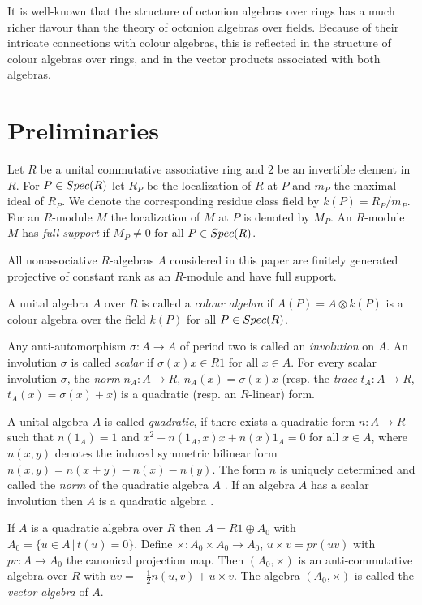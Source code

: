 \documentclass[10pt]{amsart}
\theoremstyle{plain}
\theoremstyle{definition}
\begin{document}
It is well-known that the structure of octonion algebras over rings has a much richer flavour than the theory of octonion algebras over fields.
Because of their intricate connections with colour algebras, this is reflected in the structure of colour algebras over rings, and in the vector products associated with both algebras.


\section{Preliminaries}\label{sec:1}

Let $R$ be a unital commutative associative ring and $2$ be an invertible element in $R$.
  For $P \in {\rm Spec}(R)$ let $R_P$ be the localization of $R$ at $P$  and $m_P$ the maximal ideal of $R_P$. We denote the corresponding residue class field by $k(P)=R_P/m_P$. For an $R$-module $M$ the localization of
$M$ at $P$ is denoted by $M_P$. An $R$-module $M$  has {\it full support}  if $M_P\not=0$ for all $P\in {\rm Spec}(R)$.

 All nonassociative $R$-algebras $A$ considered in this paper are finitely generated projective of constant rank as an $R$-module and have full support.

 A unital algebra $A$ over $R$ is called a \emph{colour algebra} if $A(P)=A\otimes k(P)$ is a colour algebra over the field $k(P)$ for all $P \in {\rm Spec}(R)$.

 Any anti-automorphism $\sigma:A\rightarrow A$ of period two is called an {\it involution} on $A$.
An involution $\sigma$ is called {\it scalar} if  $\sigma(x)x\in R1$ for all $x\in A$.
For every scalar involution $\sigma$,  the {\it norm} $n_A:A\rightarrow R$, $n_A(x)=\sigma(x)x$ (resp. the {\it trace} $t_A:A\rightarrow R$, $t_A(x)=\sigma(x)+x$) is a quadratic (resp. an $R$-linear) form.

 A unital algebra $A$ is called {\it quadratic}, if there exists a quadratic
form $n \colon A \rightarrow R$ such that $n(1_A) = 1$ and $x^2 - n(1_A, x)x + n(x)
1_A = 0$ for all $x \in A$, where $n(x,y)$ denotes the
induced symmetric bilinear form  $n(x, y) = n (x+y) - n(x) -n(y)$. The form $n$ is uniquely determined
and called the {\it norm} of the quadratic algebra $A$ \cite{P2}.  If an algebra $A$ has a scalar involution then  $A$ is a quadratic algebra \cite{M1}.

If $A$ is a quadratic algebra over $R$ then $A=R1\oplus A_0$ with $A_0=\{ u\in A\,|\, t(u)=0\}$. Define $\times: A_0\times A_0\rightarrow A_0$,
$u\times v=pr(uv)$ with $pr:A \rightarrow A_0$ the canonical projection map. Then $(A_0,\times)$ is an anti-commutative algebra over $R$ with $uv=-\frac{1}{2}n(u,v)+u\times v$.
The algebra $(A_0,\times)$ is called the \emph{vector algebra} of $A$.
\end{document}

